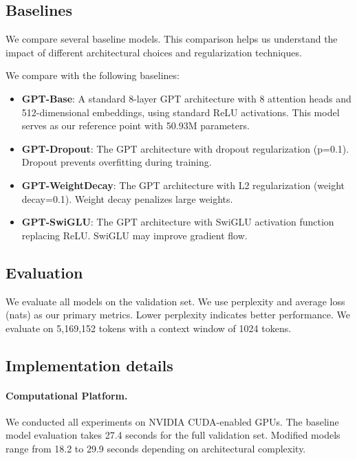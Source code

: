 \documentclass{article}
\begin{document}
\subsection{Baselines}
\label{sec:baselines}
We compare several baseline models. This comparison helps us understand the impact of different architectural choices and regularization techniques.

We compare with the following baselines:
\begin{itemize}
    \item \textbf{GPT-Base}: A standard 8-layer GPT architecture with 8 attention heads and 512-dimensional embeddings, using standard ReLU activations. This model serves as our reference point with 50.93M parameters.
    \item \textbf{GPT-Dropout}: The GPT architecture with dropout regularization (p=0.1). Dropout prevents overfitting during training.
    \item \textbf{GPT-WeightDecay}: The GPT architecture with L2 regularization (weight decay=0.1). Weight decay penalizes large weights.
    \item \textbf{GPT-SwiGLU}: The GPT architecture with SwiGLU activation function replacing ReLU. SwiGLU may improve gradient flow.
\end{itemize}

\subsection{Evaluation}
\label{sec:evaluation}
We evaluate all models on the validation set. We use perplexity and average loss (nats) as our primary metrics. Lower perplexity indicates better performance. We evaluate on 5,169,152 tokens with a context window of 1024 tokens.

\subsection{Implementation details}
\label{sec:implementation_details}
\paragraph{Computational Platform.} We conducted all experiments on NVIDIA CUDA-enabled GPUs. The baseline model evaluation takes 27.4 seconds for the full validation set. Modified models range from 18.2 to 29.9 seconds depending on architectural complexity.
\end{document}
